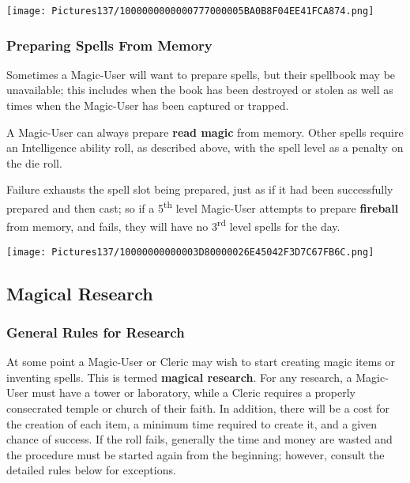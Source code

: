 \documentclass[a4paper,twoside,openany,10pt]{book}
\begin{document}
\begin{multicols}{2}
 \begin{center}
 	\texttt{[image: Pictures137/1000000000000777000005BA0B8F04EE41FCA874.png]} 
 \end{center}

\subsubsection{Preparing Spells From Memory}\label{preparing-spells-from-memory}

Sometimes a Magic-User will want to prepare spells, but their spellbook may be unavailable; this includes when the book has been destroyed or stolen as well as times when the Magic-User has been captured or trapped.

A Magic-User can always prepare \textbf{read magic} from memory. Other spells require an Intelligence ability roll, as described above, with the spell level as a penalty on the die roll.

Failure exhausts the spell slot being prepared, just as if it had been successfully prepared and then cast; so if a 5\textsuperscript{th} level Magic-User attempts to prepare \textbf{fireball} from memory, and fails, they will have no 3\textsuperscript{rd} level spells for the day.

\begin{center}
	\texttt{[image: Pictures137/10000000000003D80000026E45042F3D7C67FB6C.png]}
\end{center}

\subsection{Magical Research}\label{magical-research}

\subsubsection{General Rules for Research}\label{general-rules-for-research}

At some point a Magic-User or Cleric may wish to start creating magic items or inventing spells. This is termed \textbf{magical research}. For any research, a Magic-User must have a tower or laboratory, while a Cleric requires a properly consecrated temple or church of their faith. In addition, there will be a cost for the creation of each item, a minimum time required to create it, and a given chance of success. If the roll fails, generally the time and money are wasted and the procedure must be started again from the beginning; however, consult the detailed rules below for exceptions.


\end{multicols}
\end{document}
